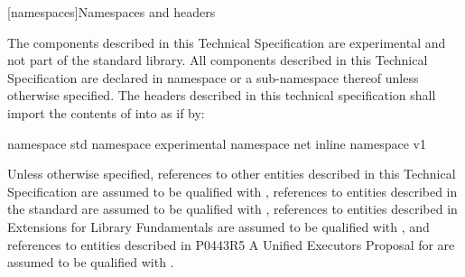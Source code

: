 
[namespaces]{Namespaces and headers}

\pnum
The components described in this Technical Specification are experimental and not part of the \Cpp standard library. All components described in this Technical Specification are declared in namespace  or a sub-namespace thereof unless otherwise specified. The headers described in this technical specification shall import the contents of  into  as if by:

\begin{codeblock}
namespace std {
  namespace experimental {
    namespace net {
      inline namespace v1 {}
    }
  }
}
\end{codeblock}

\pnum
Unless otherwise specified, references to other entities described in this Technical Specification are assumed to be qualified with , references to entities described in the \Cpp standard are assumed to be qualified with , references to entities described in \Cpp Extensions for Library Fundamentals are assumed to be qualified with , and references to entities described in P0443R5 A Unified Executors Proposal for \Cpp are assumed to be qualified with .


